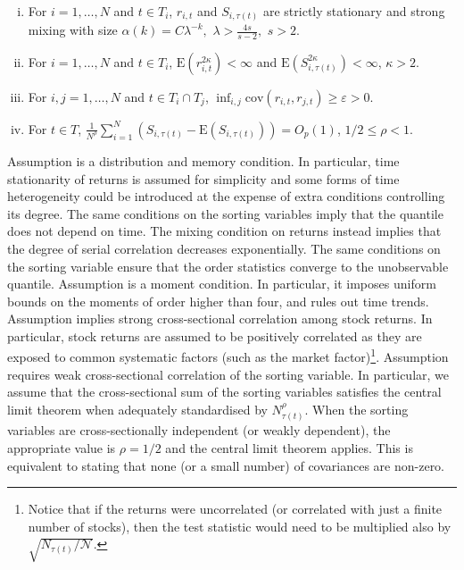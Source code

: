 \begin{assumption}
\label{ass:mixing} $ $

\begin{enumerate}[(i)]
\item For $i=1,\ldots,N$ and $t \in T_i$, $r_{i,t}$ and $S_{i,\tau(t)}$ are strictly stationary and strong mixing with size $\alpha (k)=C\lambda ^{-k},$ $\lambda >\frac{4s}{s-2},$ $s>2$. \label{ass:mixing, i} 

\item For $i=1,\ldots,N$ and $t \in T_i$, $\mathrm{E}\left( r_{i,t}^{2\kappa }\right) <\infty $ and $\mathrm{E}\left( S_{i,\tau(t)}^{2\kappa }\right) <\infty$, $\kappa >2$. \label{ass:mixing, iii}

\item For $i,j=1,\ldots, N$ and $t\in T_{i}\cap T_{j}$, $\inf_{i,j}\mathrm{cov}\left(r_{i,t},r_{j,t}\right) \geq \varepsilon >0$. \label{ass:mixing, iv}

\item For $t \in T$, $\frac{1}{N^\rho} \sum_{i=1}^N \left( S_{i,\tau(t)}-\mathrm{E}\left( S_{i,\tau(t)}\right) \right) = O_{p}(1)$,  $1/2\leq \rho <1$. \label{ass:mixing, v} 
\end{enumerate}
\end{assumption}

\noindent
Assumption  is a distribution and memory condition. In particular, time stationarity of returns is assumed for simplicity and some forms of time heterogeneity could be introduced at the expense of extra conditions controlling its degree. The same conditions on the sorting variables imply that the quantile does not depend on time. The mixing condition on returns instead implies that the degree of serial correlation decreases exponentially. The same conditions on the sorting variable ensure that the order statistics converge to the unobservable quantile. Assumption  is a moment condition. In particular, it imposes uniform bounds on the moments of order higher than four, and rules out time trends. Assumption  implies strong cross-sectional correlation among stock returns. In particular, stock returns are assumed to be positively correlated as they are exposed to common systematic factors (such as the market factor)\footnote{Notice that if the returns were uncorrelated (or correlated with just a finite number of stocks), then the test statistic would need to be multiplied also by $\sqrt{N_{\tau(t)}/\mathcal{N}}$.}. Assumption  requires weak cross-sectional correlation of the sorting variable. In particular, we assume that the cross-sectional sum of the sorting variables satisfies the central limit theorem when adequately standardised by $N_{\tau(t)}^\rho$. When the sorting variables are cross-sectionally independent (or weakly dependent), the appropriate value is $\rho=1/2$ and the central limit theorem applies. This is equivalent to stating that none (or a small number) of covariances are non-zero.

